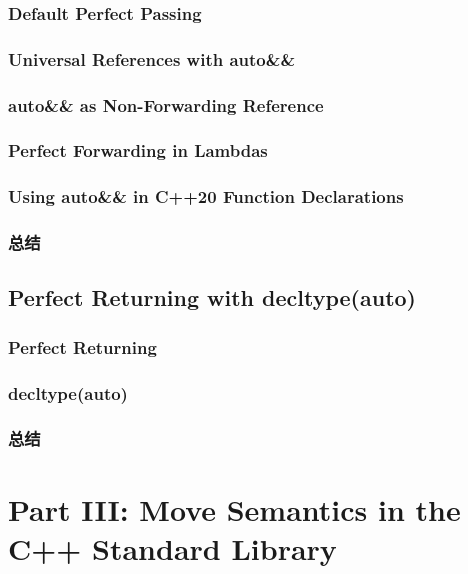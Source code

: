 \documentclass[11pt,a4paper,UTF8]{ctexart}
\begin{document}
		\subsubsection{Default Perfect Passing}
		\subsubsection{Universal References with auto\&\&}
		\subsubsection{auto\&\& as Non-Forwarding Reference}
		\subsubsection{Perfect Forwarding in Lambdas}
		\subsubsection{Using auto\&\& in C++20 Function Declarations}
		\subsubsection{总结}
	\subsection{Perfect Returning with decltype(auto)}
		\subsubsection{Perfect Returning}
		\subsubsection{decltype(auto)}
		\subsubsection{总结}
		
	\section{Part III: Move Semantics in the C++ Standard Library}
\end{document}
